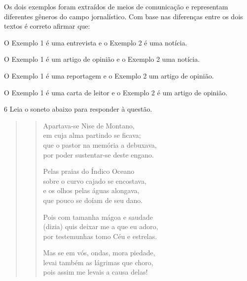 
Os dois exemplos foram extraídos de meios de comunicação e representam
diferentes gêneros do campo jornalístico. Com base nas diferenças entre
os dois textos é correto afirmar que:

\begin{escolha}
    
    \item O Exemplo 1 é uma entrevista e o Exemplo 2 é uma notícia.
    
    \item O Exemplo 1 é um artigo de opinião e o Exemplo 2 uma notícia.
    
    \item O Exemplo 1 é uma reportagem e o Exemplo 2 um artigo de opinião.
    
    \item O Exemplo 1 é uma carta de leitor e o Exemplo 2 é um artigo de opinião.

\end{escolha}

\num{6} Leia o soneto abaixo para responder à questão. 

\begin{quote}
\begin{verse}

Apartava-se Nise de Montano, \\
em cuja alma partindo se ficava; \\
que o pastor na memória a debuxava, \\
por poder sustentar-se deste engano.

Pelas praias do Índico Oceano \\
sobre o curvo cajado se encostava, \\
e os olhos pelas águas alongava, \\
que pouco se doíam de seu dano.

Pois com tamanha mágoa e saudade \\
(dizia) quis deixar me a que eu adoro, \\
por testemunhas tomo Céu e estrelas.

Mas se em vós, ondas, mora piedade, \\
levai também as lágrimas que choro, \\
pois assim me levais a causa delas!

\end{verse}
\end{quote}

